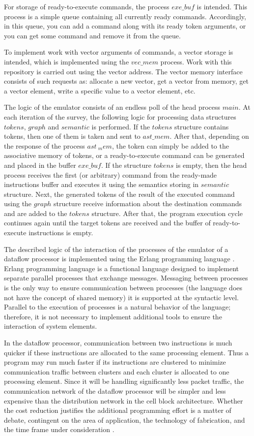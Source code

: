 \documentclass[
11pt,%
tightenlines,%
twoside,%
onecolumn,%
nofloats,%
nobibnotes,%
nofootinbib,%
superscriptaddress,%
noshowpacs,%
centertags]%
{revtex4}
\begin{document}
For storage of ready-to-execute commands, the process $exe\_buf$ is intended.
This process is a simple queue containing all currently ready commands.
Accordingly, in this queue, you can add a command along with its ready token arguments, or you can get some command and remove it from the queue.

To implement work with vector arguments of commands, a vector storage is intended, which is implemented using the $vec\_mem$ process.
Work with this repository is carried out using the vector address.
The vector memory interface consists of such requests as: allocate a new vector, get a vector from memory, get a vector element, write a specific value to a vector element, etc.

The logic of the emulator consists of an endless poll of the head process $main$.
At each iteration of the survey, the following logic for processing data structures $tokens$, $graph$ and $semantic$ is performed.
If the $tokens$ structure contains tokens, then one of them is taken and sent to $ast\_mem$.
After that, depending on the response of the process $ast\ _mem$, the token can simply be added to the associative memory of tokens, or a ready-to-execute command can be generated and placed in the buffer $exe\_buf$.
If the structure $tokens$ is empty, then the head process receives the first (or arbitrary) command from the ready-made instructions buffer and executes it using the semantics storing in $semantic$ structure.
Next, the generated tokens of the result of the executed command using the $graph$ structure receive information about the destination commands and are added to the $tokens$ structure.
After that, the program execution cycle continues again until the target tokens are received and the buffer of ready-to-execute instructions is empty.

The described logic of the interaction of the processes of the emulator of a dataflow processor is implemented using the Erlang programming language \cite {Armstrong, Cesarini}.
Erlang programming language is a functional language designed to implement separate parallel processes that exchange messages.
Messaging between processes is the only way to ensure communication between processes (the language does not have the concept of shared memory) it is supported at the syntactic level.
Parallel to the execution of processes is a natural behavior of the language; therefore, it is not necessary to implement additional tools to ensure the interaction of system elements.

In the dataflow processor, communication between two instructions is much quicker if these instructions are allocated to the same processing element.
Thus a program may run much faster if its instructions are clustered to minimize communication traffic between clusters and each cluster is allocated to one processing element.
Since it will be handling significantly less packet traffic, the communication network of the dataflow processor will be simpler and less expensive than the distribution network in the cell block architecture.
Whether the cost reduction justifies the additional programming effort is a matter of debate, contingent on the area of application, the technology of fabrication, and the time frame under consideration \cite{Dennis}.
\end{document}
